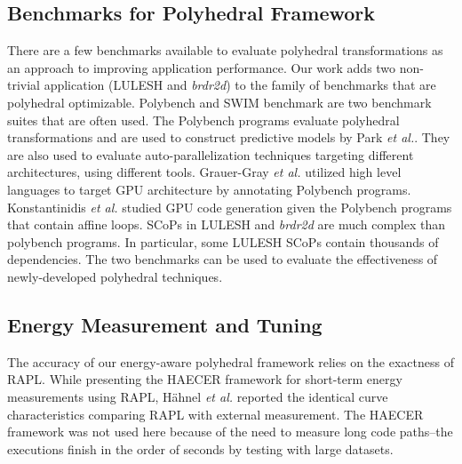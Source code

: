 \subsection{Benchmarks for Polyhedral Framework}
There are a few benchmarks available to evaluate polyhedral transformations as 
an approach to improving application performance.  Our work adds two non-trivial application (LULESH and \emph{brdr2d})
to the family of benchmarks that are polyhedral optimizable. Polybench\cite{Polybench} and 
SWIM\cite{SWIM} benchmark are two benchmark suites that are often used. The Polybench programs evaluate polyhedral 
transformations and are used to construct predictive models by Park {\it et al.}\cite{EJ2011,EJ2012, EJ2013}.
They are also used to evaluate auto-parallelization techniques targeting different architectures,
using different tools. Grauer-Gray {\it et al.}\cite{Scott} utilized high level languages 
to target GPU architecture by annotating Polybench programs. Konstantinidis {\it et al.}\cite{LCPC2013}
studied GPU code generation given the Polybench programs that contain affine loops. 
SCoPs in LULESH and \emph{brdr2d} are much complex than polybench programs. 
In particular, some LULESH SCoPs contain thousands of dependencies. The  
two benchmarks can be used to evaluate the effectiveness of newly-developed polyhedral techniques. 
\subsection{Energy Measurement and Tuning}
The accuracy of our energy-aware polyhedral framework relies on the exactness
of RAPL. While presenting the HAECER framework for short-term energy measurements 
using RAPL, H\"{a}hnel {\it et al.} reported the identical
curve characteristics comparing RAPL with external measurement\cite{RAPL-Related}.
The HAECER framework was not used here because of the need to measure long code
paths--the executions finish in the order of seconds by testing with large datasets.

